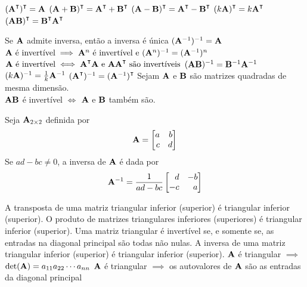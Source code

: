 \begin{theorem}
	\leavevmode
	\begin{outline}[enumerate]
		\1 \( (\m{A}\T)\T = \m{A} \)
		\1 \( (\m{A}+\m{B})\T = \m{A}\T + \m{B}\T \) 
		\1 \( (\m{A}-\m{B})\T = \m{A}\T - \m{B}\T \)
		\1 \( (k\m{A})\T = k\m{A}\T \)
		\1 \( (\m{A}\m{B})\T = \m{B}\T \m{A}\T \) 
	\end{outline}
\end{theorem}


\begin{theorem}
	\leavevmode
	\begin{outline}[enumerate]
		\1 Se $\mathbf{A}$ admite inversa, então a inversa é única
		\1 \( (\mathbf{A}^{-1})^{-1} = \mathbf{A} \)
		\1 \( \mathbf{A} \text{ é invertível} \implies \mathbf{A}^n \text{ é invertível e } (\mathbf{A}^n)^{-1} = (\mathbf{A}^{-1})^n \)
		\1 \( \m{A} \text{ é invertível} \iff \m{A}\T\m{A} \text{ e } \m{A}\m{A}\T \text{ são invertíveis} \)
		\1 \( (\mathbf{A}\mathbf{B})^{-1} = \mathbf{B}^{-1}\mathbf{A}^{-1} \)
		\1 \( (k\mathbf{A})^{-1} = \frac{1}{k}\mathbf{A}^{-1} \)
		\1 \( (\m{A}\T)\inv = (\m{A}\inv)\T \)
		\1 Sejam $\mathbf{A}$ e $\mathbf{B}$ são matrizes quadradas de mesma dimensão. \\
		$\mathbf{A}\mathbf{B}$ é invertível $\iff$ $\mathbf{A}$ e $\mathbf{B}$ também são.
	\end{outline}
\end{theorem}

\begin{theorem}
	Seja $\mathbf{A}_{2\times 2}$ definida por
	\begin{equation}
		\m{A} = \begin{bmatrix*}[r]
			a & b \\
			c & d
		\end{bmatrix*}
	\end{equation}
	Se $ad-bc \neq 0$, a inversa de $\mathbf{A}$ é dada por
	\begin{equation}
		\m{A}\inv = \frac{1}{ad-bc} 
		\begin{bmatrix*}[r]
			d & -b \\
			-c & a
		\end{bmatrix*}
	\end{equation}
\end{theorem}

\begin{theorem}
	\leavevmode
	\begin{outline}[enumerate]
		\1 A transposta de uma matriz triangular inferior (superior) é triangular inferior (superior).
		\1 O produto de matrizes triangulares inferiores (superiores) é triangular inferior (superior).
		\1 Uma matriz triangular é invertível se, e somente se, as entradas na diagonal principal são todas não nulas.
		\1 A inversa de uma matriz triangular inferior (superior) é triangular inferior (superior).
		\1 $\mathbf{A}$ é triangular $\implies$ $\det(\mathbf{A})=a_{11} a_{22} \cdots a_{nn}$
		\1 $\mathbf{A}$ é triangular $\implies$ os autovalores de $\mathbf{A}$ são as entradas da diagonal principal
		
	\end{outline}
\end{theorem}

